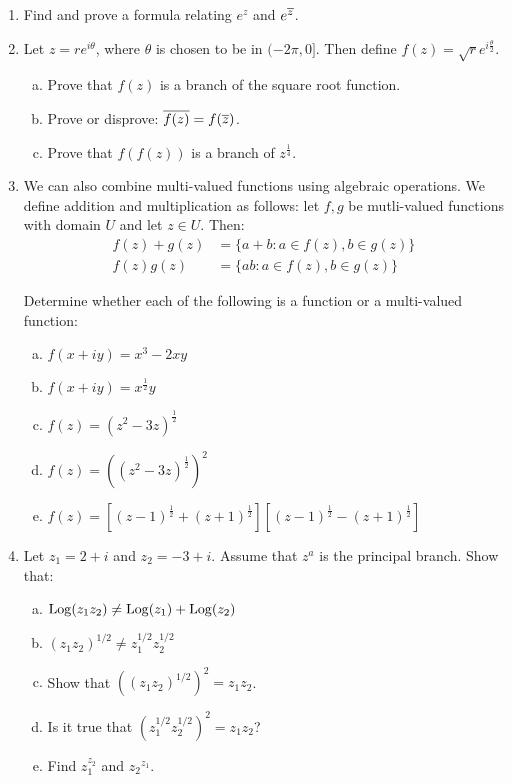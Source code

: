 \begin{enumerate}
\item Find and prove a formula relating $e^z$ and $e^{\overline{z}}$.


\item Let $z = re^{i\theta}$, where $\theta$ is chosen to be in $(-2\pi,0]$. Then define $f(z) = \sqrt{r}e^{i\frac{\theta}{2}}$.

\begin{enumerate}[a)]
\item Prove that $f(z)$ is a branch of the square root function.
\item Prove or disprove: $\overline{f(z)} = f(\overline{z})$.
\item Prove that $f(f(z))$ is a branch of $z^{\frac{1}{4}}$.
\end{enumerate}


\item We can also combine multi-valued functions using algebraic operations. We define addition and multiplication as follows: let $f, g$ be mutli-valued functions with domain $U$ and let $z\in U$. Then:
\begin{align*}
	f(z) + g(z) 	&= \{a+b: a\in f(z), b\in g(z)\}\\
	f(z)g(z) 	&= \{ab: a\in f(z), b\in g(z)\}
\end{align*}

Determine whether each of the following is a function or a multi-valued function:

\begin{enumerate}[a)]
\item $f(x + iy) = x^3 - 2xy$
\item $f(x + iy) = x^{\frac{1}{2}}y$
\item $f(z) = (z^2 - 3z)^\frac{1}{2}$
\item $f(z) = \left((z^2 - 3z)^\frac{1}{2}\right)^2$
\item $f(z) = [(z-1)^{\frac{1}{2}} + (z+1)^{\frac{1}{2}}][(z-1)^{\frac{1}{2}} - (z+1)^{\frac{1}{2}}]$
\end{enumerate}


\item Let $z_1 = 2 + i$ and $z_2 = -3 + i$. Assume that $z^a$ is the principal branch. Show that:

\begin{enumerate}[a)]
\item $\mathrm{Log}(z_1z_2) \ne \mathrm{Log}(z_1) + \mathrm{Log}(z_2)$
\item $(z_1z_2)^{1/2} \ne z_1^{1/2}z_2^{1/2}$
\item Show that $\left((z_1z_2)^{1/2}\right)^2 = z_1z_2$.
\item Is it true that $\left(z_1^{1/2}z_2^{1/2}\right)^2 = z_1z_2$?
\item Find $z_1^{z_2}$ and ${z_2}^{z_1}$.
\end{enumerate}



\end{enumerate}
